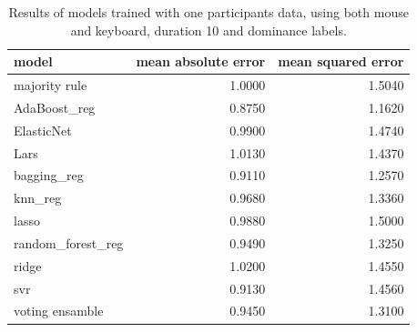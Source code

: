 \documentclass[../main.tex]{subfiles}
\begin{document}
\begin{table}[!h]
    \centering
    \begin{tabular}{lrr}
        \toprule
                     model &  mean absolute error &  mean squared error \\
        \midrule
             majority rule &               1.0000 &              1.5040 \\
              AdaBoost\_reg &               0.8750 &              1.1620 \\
                ElasticNet &               0.9900 &              1.4740 \\
                      Lars &               1.0130 &              1.4370 \\
               bagging\_reg &               0.9110 &              1.2570 \\
                   knn\_reg &               0.9680 &              1.3360 \\
                     lasso &               0.9880 &              1.5000 \\
         random\_forest\_reg &               0.9490 &              1.3250 \\
                     ridge &               1.0200 &              1.4550 \\
                       svr &               0.9130 &              1.4560 \\
           voting ensamble &               0.9450 &              1.3100 \\
        \bottomrule
    \end{tabular}
    \caption{Results of models trained with one participants data, using both mouse and keyboard, duration 10 and dominance labels.}     
\end{table}
\end{document}
